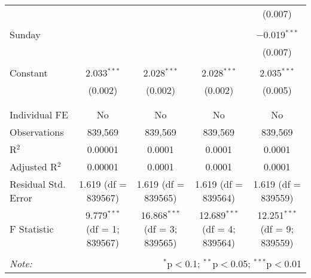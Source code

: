 \documentclass[
]{article}
\begin{document}
\begin{table}[!htbp]
{\begin{tabular}{@{\extracolsep{5pt}}lcccc}
  &  &  &  & (0.007) \\ 
  & & & & \\ 
 Sunday &  &  &  & $-$0.019$^{***}$ \\ 
  &  &  &  & (0.007) \\ 
  & & & & \\ 
 Constant & 2.033$^{***}$ & 2.028$^{***}$ & 2.028$^{***}$ & 2.035$^{***}$ \\ 
  & (0.002) & (0.002) & (0.002) & (0.005) \\ 
  & & & & \\ 
\hline \\[-1.8ex] 
Individual FE & No & No & No & No \\ 
Observations & 839,569 & 839,569 & 839,569 & 839,569 \\ 
R$^{2}$ & 0.00001 & 0.0001 & 0.0001 & 0.0001 \\ 
Adjusted R$^{2}$ & 0.00001 & 0.0001 & 0.0001 & 0.0001 \\ 
Residual Std. Error & 1.619 (df = 839567) & 1.619 (df = 839565) & 1.619 (df = 839564) & 1.619 (df = 839559) \\ 
F Statistic & 9.779$^{***}$ (df = 1; 839567) & 16.868$^{***}$ (df = 3; 839565) & 12.689$^{***}$ (df = 4; 839564) & 12.251$^{***}$ (df = 9; 839559) \\ 
\hline 
\hline \\[-1.8ex] 
\textit{Note:}  & \multicolumn{4}{r}{$^{*}$p$<$0.1; $^{**}$p$<$0.05; $^{***}$p$<$0.01} \\ 
\end{tabular}
} 
\end{table} 
\newpage
\end{document}
